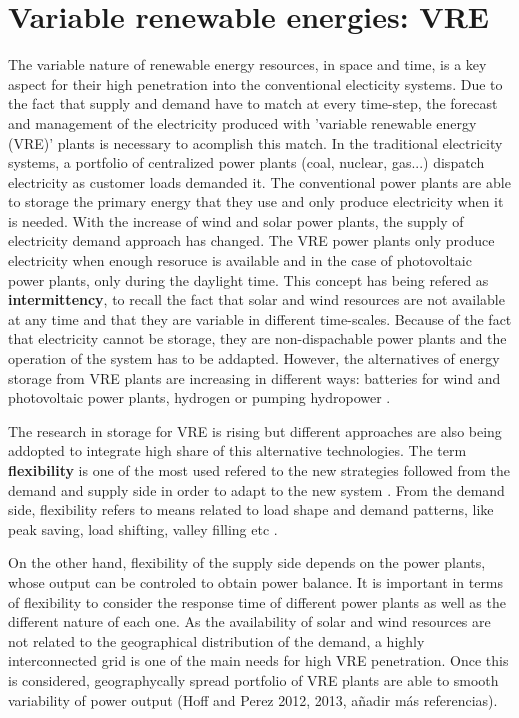 \section{Variable renewable energies: VRE}

The variable nature of renewable energy resources, in space and time, is a key aspect for their high penetration into the conventional electicity systems. Due to the fact that supply and demand have to match at every time-step, the forecast and management of the electricity produced with 'variable renewable energy (VRE)' plants is necessary to acomplish this match. In the traditional electricity systems, a portfolio of centralized power plants (coal, nuclear, gas...) dispatch electricity as customer loads demanded it. The conventional power plants are able to storage the primary energy that they use and only produce electricity when it is needed. With the increase of wind and solar power plants, the supply of electricity demand approach has changed. The VRE power plants only produce electricity when enough resoruce is available and in the case of photovoltaic power plants, only during the daylight time. This concept has being refered as \textbf{intermittency}, to recall the fact that solar and wind resources are not available at any time and that they are variable in different time-scales. Because of the fact that electricity cannot be storage, they are non-dispachable power plants and the operation of the system has to be addapted. However, the alternatives of energy storage from VRE plants are increasing in different ways: batteries for wind and photovoltaic power plants, hydrogen or pumping hydropower \cite*{Lund2015, Blanco2018, Schaber2004}.

The research in storage for VRE is rising but different approaches are also being addopted to integrate high share of this alternative technologies. The term \textbf{flexibility} is one of the most used refered to the new strategies followed from the demand and supply side in order to adapt to the new system \cite*{KROPOSKI2017}. From the demand side, flexibility refers to means related to load shape and demand patterns, like peak saving, load shifting, valley filling etc \cite*{Lund2015}.

On the other hand, flexibility of the supply side depends on the power plants, whose output can be controled to obtain power balance. It is important in terms of flexibility to consider the response time of different power plants as well as the different nature of each one. As the availability of solar and wind resources are not related to the geographical distribution of the demand, a highly interconnected grid is one of the main needs for high VRE penetration. Once this is considered, geographycally spread portfolio of VRE plants are able to smooth variability of power output \cite*{KROPOSKI2017, Marcos2012}(Hoff and Perez 2012, 2013, añadir más referencias).

